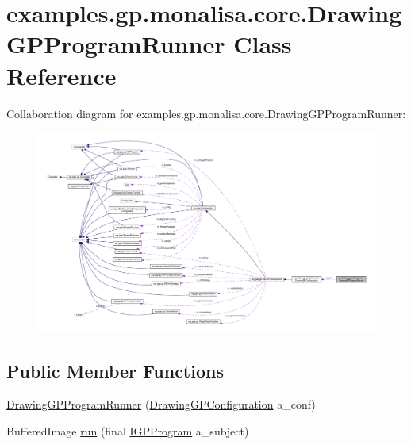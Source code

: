 \hypertarget{classexamples_1_1gp_1_1monalisa_1_1core_1_1_drawing_g_p_program_runner}{\section{examples.\-gp.\-monalisa.\-core.\-Drawing\-G\-P\-Program\-Runner Class Reference}
\label{classexamples_1_1gp_1_1monalisa_1_1core_1_1_drawing_g_p_program_runner}
}


Collaboration diagram for examples.\-gp.\-monalisa.\-core.\-Drawing\-G\-P\-Program\-Runner\-:
\nopagebreak
\begin{figure}[H]
\begin{center}
\leavevmode
\includegraphics[width=350pt]{classexamples_1_1gp_1_1monalisa_1_1core_1_1_drawing_g_p_program_runner__coll__graph}
\end{center}
\end{figure}
\subsection*{Public Member Functions}
\begin{DoxyCompactItemize}
\item 
\hyperlink{classexamples_1_1gp_1_1monalisa_1_1core_1_1_drawing_g_p_program_runner_a2bd725a80e07f247a15c05a4a93c9cca}{Drawing\-G\-P\-Program\-Runner} (\hyperlink{classexamples_1_1gp_1_1monalisa_1_1core_1_1_drawing_g_p_configuration}{Drawing\-G\-P\-Configuration} a\-\_\-conf)
\item 
Buffered\-Image \hyperlink{classexamples_1_1gp_1_1monalisa_1_1core_1_1_drawing_g_p_program_runner_a3dfddd8cacb94b37a5597ddb077c527e}{run} (final \hyperlink{interfaceorg_1_1jgap_1_1gp_1_1_i_g_p_program}{I\-G\-P\-Program} a\-\_\-subject)
\end{DoxyCompactItemize}
